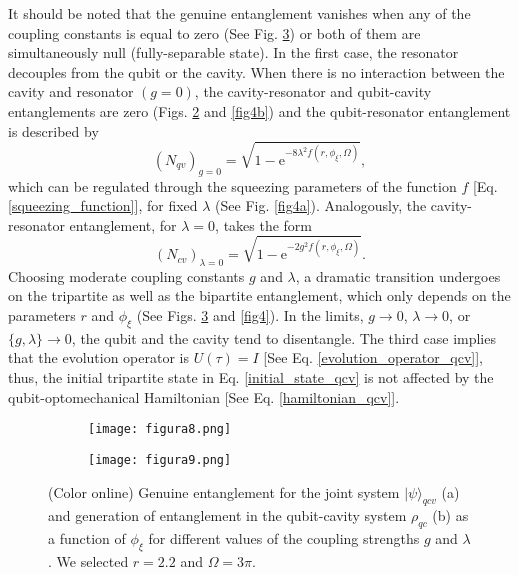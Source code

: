 It should be noted that the genuine entanglement vanishes when any of the coupling constants is equal to zero (See Fig. \ref{fig3}) or both of them are simultaneously null (fully-separable state). In the first case, the resonator decouples from the qubit or the cavity. When there is no interaction between the cavity and resonator $(g=0)$, the cavity-resonator and qubit-cavity entanglements are zero (Figs. \ref{fig3b} and \ref{fig4b}) and the qubit-resonator entanglement is described by
\begin{equation}\label{qub_vib_ent_limit}
\left(N_{qv}\right)_{g=0}=\sqrt{1-\textrm{e}^{-8\lambda^{2}f\left(r, \phi_{\xi}, \Omega\right)}},
\end{equation}
which can be regulated through the squeezing parameters of the function $f$ [Eq. \eqref{squeezing_function}], for fixed $\lambda$ (See Fig. \ref{fig4a}). Analogously, the cavity-resonator entanglement, for $\lambda=0$, takes the form
\begin{equation}\label{cav_vib_ent_limit}
\left(N_{cv}\right)_{\lambda=0}=\sqrt{1-\textrm{e}^{-2g^{2}f\left(r, \phi_{\xi}, \Omega\right)}}.
\end{equation}
Choosing moderate coupling constants $g$ and $\lambda$, a dramatic transition undergoes on the tripartite as well as the bipartite entanglement, which only depends on the parameters $r$ and $\phi_{\xi}$ (See Figs. \ref{fig3} and \ref{fig4}). In the limits, $g \rightarrow 0$, $\lambda \rightarrow 0$, or $\{g, \lambda\} \rightarrow 0$, the qubit and the cavity tend to disentangle. The third case implies that the evolution operator is $U(\tau)=I$ [See Eq. \eqref{evolution_operator_qcv}], thus, the initial tripartite state in Eq. \eqref{initial_state_qcv} is not affected by the qubit-optomechanical Hamiltonian [See Eq. \eqref{hamiltonian_qcv}]. 

\begin{figure}[h!]

\begin{subfigure}{\textwidth}
\texttt{[image: figura8.png]}
\caption{}
\label{fig3a}
\end{subfigure}

\bigskip

\begin{subfigure}{\textwidth}
\texttt{[image: figura9.png]}
\caption{}
\label{fig3b}
\end{subfigure}

\caption{(Color online) Genuine entanglement for the joint system $|\psi\rangle_{qcv}$ (a) and generation of entanglement in the qubit-cavity system $\rho_{qc}$ (b) as a function of $\phi_{\xi}$ for different values of the coupling strengths $g$ and $\lambda$. We selected $r=2.2$ and $\Omega=3\pi.$}
\label{fig3}

\end{figure}

